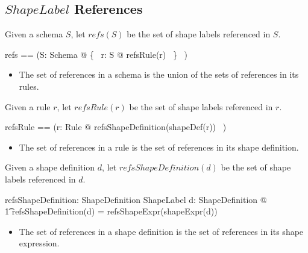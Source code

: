 \documentclass{article}
\begin{document}
\subsection{$ShapeLabel$ References}
Given a schema $S$, let $refs(S)$ be the set of shape labels referenced in $S$.
\begin{zed}
	refs == (\lambda S: Schema @ \bigcup \{~ r: \ran S @ refsRule(r) ~\} ~)
\end{zed}
\begin{itemize}
\item The set of references in a schema is the union of the sets of references in its rules.
\end{itemize}

Given a rule $r$, let $refsRule(r)$ be the set of shape labels referenced in $r$.
\begin{zed}
	refsRule == (\lambda r: Rule @ refsShapeDefinition(shapeDef(r)) ~)
\end{zed}
\begin{itemize}
\item The set of references in a rule is the set of references in its shape definition.
\end{itemize}

Given a shape definition $d$, let $refsShapeDefinition(d)$ be the set of shape labels referenced in $d$.
\begin{axdef}
	refsShapeDefinition: ShapeDefinition \fun \finset ShapeLabel
\where
	\forall d: ShapeDefinition @ \\
\t1		refsShapeDefinition(d) = refsShapeExpr(shapeExpr(d))
\end{axdef}
\begin{itemize}
\item The set of references in a shape definition is the set of references in its shape expression.
\end{itemize}
\end{document}
